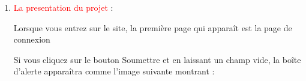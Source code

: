 \documentclass{article}
\begin{document}
\begin{enumerate}
        \vspace{1cm}
  
        
        
        
        
        
        
   \vspace{1cm}
   \item \textcolor{red}{\huge La presentation du projet} :  
   \vspace{0.7cm}
   

	Lorsque vous entrez sur le site, la première page qui apparaît est la page de connexion
	
	\hspace*{-0.7in}
               \noindent{}
               
               
               
               \newpage
               
               
    Si vous cliquez sur le bouton Soumettre et en laissant un champ vide, la boîte d'alerte apparaîtra comme l'image suivante montrant :
   \vspace{0.7cm}
   
\hspace*{-0.7in}

               \noindent{}


\end{enumerate}
\end{document}
